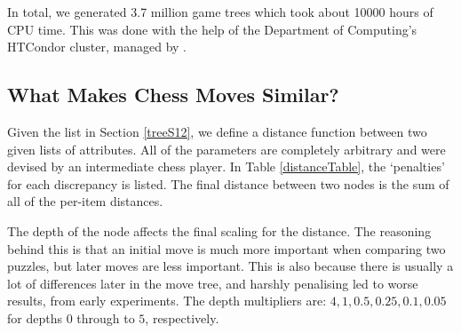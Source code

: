 In total, we generated 3.7 million game trees which took about 10000 hours of
CPU time. This was done with the help of the Department of Computing's HTCondor
cluster, managed by \citet{csgCondor}.

\subsection{What Makes Chess Moves Similar?}\label{treeS13}

Given the list in Section \ref{treeS12}, we define a distance function
between two given lists of attributes. All of the parameters are completely
arbitrary and were devised by an intermediate chess player. In Table
\ref{distanceTable}, the `penalties' for each discrepancy is listed. The final
distance between two nodes is the sum of all of the per-item distances.

The depth of the node affects the final scaling for the distance. The reasoning
behind this is that an initial move is much more important when comparing two
puzzles, but later moves are less important. This is also because there is
usually a lot of differences later in the move tree, and harshly penalising led
to worse results, from early experiments. The depth multipliers are: $4, 1,
0.5, 0.25, 0.1, 0.05$ for depths $0$ through to $5$, respectively.

